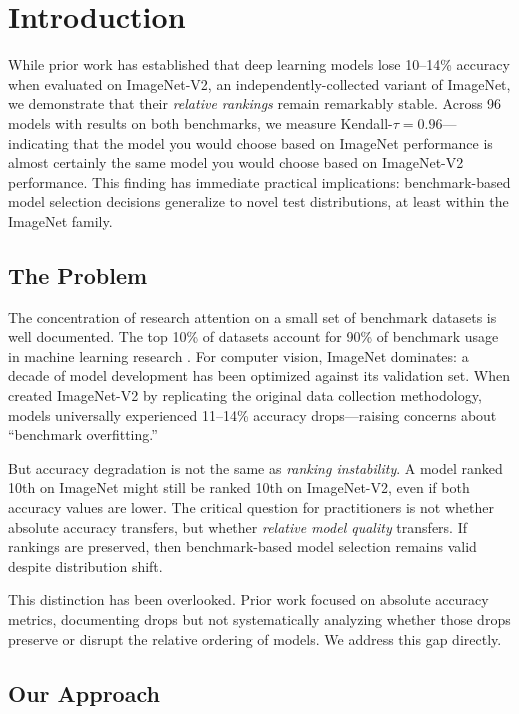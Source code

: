 \section{Introduction}
\label{sec:introduction}

While prior work has established that deep learning models lose 10--14\% accuracy when evaluated on ImageNet-V2, an independently-collected variant of ImageNet, we demonstrate that their \emph{relative rankings} remain remarkably stable. Across 96 models with results on both benchmarks, we measure Kendall-$\tau = 0.96$---indicating that the model you would choose based on ImageNet performance is almost certainly the same model you would choose based on ImageNet-V2 performance. This finding has immediate practical implications: benchmark-based model selection decisions generalize to novel test distributions, at least within the ImageNet family.

\subsection{The Problem}

The concentration of research attention on a small set of benchmark datasets is well documented. The top 10\% of datasets account for 90\% of benchmark usage in machine learning research \citep{koch2021reduced}. For computer vision, ImageNet dominates: a decade of model development has been optimized against its validation set. When \citet{recht2019imagenet} created ImageNet-V2 by replicating the original data collection methodology, models universally experienced 11--14\% accuracy drops---raising concerns about ``benchmark overfitting.''

But accuracy degradation is not the same as \emph{ranking instability}. A model ranked 10th on ImageNet might still be ranked 10th on ImageNet-V2, even if both accuracy values are lower. The critical question for practitioners is not whether absolute accuracy transfers, but whether \emph{relative model quality} transfers. If rankings are preserved, then benchmark-based model selection remains valid despite distribution shift.

This distinction has been overlooked. Prior work focused on absolute accuracy metrics, documenting drops but not systematically analyzing whether those drops preserve or disrupt the relative ordering of models. We address this gap directly.

\subsection{Our Approach}

